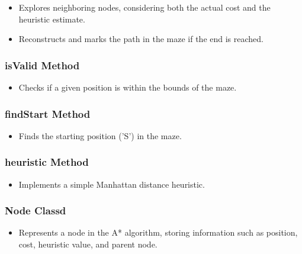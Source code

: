 \documentclass[12pt]{report}
\begin{document}
\begin{itemize}
    \item Explores neighboring nodes, considering both the actual cost and the heuristic estimate.
\end{itemize}
\begin{itemize}
    \item Reconstructs and marks the path in the maze if the end is reached.
\end{itemize}


\subsubsection{isValid Method}

\begin{itemize}
    \item Checks if a given position is within the bounds of the maze.
\end{itemize}

\subsubsection{findStart Method}

\begin{itemize}
    \item Finds the starting position ('S') in the maze.
\end{itemize}

\subsubsection{heuristic Method}

\begin{itemize}
    \item Implements a simple Manhattan distance heuristic.
\end{itemize}

\subsubsection{Node Classd}

\begin{itemize}
    \item Represents a node in the A* algorithm, storing information such as position, cost, heuristic value, and parent node.
\end{itemize}
\end{document}
